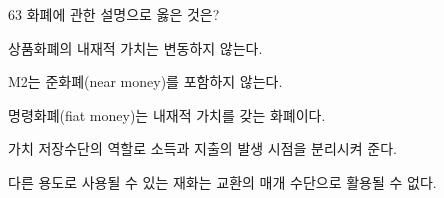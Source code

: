 \begin{question}{63}
화폐에 관한 설명으로 옳은 것은?
\begin{choices}
  \item 상품화폐의 내재적 가치는 변동하지 않는다.
  \item M2는 준화폐(near money)를 포함하지 않는다.
  \item 명령화폐(fiat money)는 내재적 가치를 갖는 화폐이다.
  \item 가치 저장수단의 역할로 소득과 지출의 발생 시점을 분리시켜 준다.
  \item 다른 용도로 사용될 수 있는 재화는 교환의 매개 수단으로 활용될 수 없다.
\end{choices}
\end{question}
